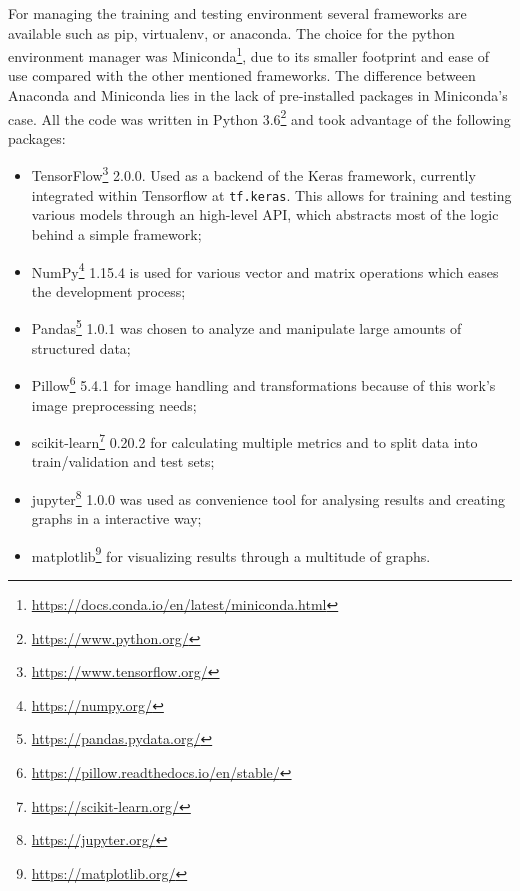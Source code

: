     For managing the training and testing environment several frameworks are available such as pip, virtualenv, or anaconda. The choice for the python environment manager was Miniconda\footnote{\url{https://docs.conda.io/en/latest/miniconda.html}}, due to its smaller footprint and ease of use compared with the other mentioned frameworks. The difference between Anaconda and Miniconda lies in the lack of pre-installed packages in Miniconda's case. 
    All the code was written in Python 3.6\footnote{\url{https://www.python.org/}} and took advantage of the following packages:
    
    \begin{itemize}
        \item TensorFlow\footnote{\url{https://www.tensorflow.org/}} 2.0.0. Used as a backend of the Keras framework, currently integrated within Tensorflow at \verb|tf.keras|. This allows for training and testing various models through an high-level API, which abstracts most of the logic behind a simple framework;
        \item NumPy\footnote{\url{https://numpy.org/}} 1.15.4 is used for various vector and matrix operations which eases the development process;
        \item Pandas\footnote{\url{https://pandas.pydata.org/}} 1.0.1 was chosen to analyze and manipulate large amounts of structured data;
        \item Pillow\footnote{\url{https://pillow.readthedocs.io/en/stable/}} 5.4.1 for image handling and transformations because of this work's image preprocessing needs;
        \item scikit-learn\footnote{\url{https://scikit-learn.org/}} 0.20.2 for calculating multiple metrics and to split data into train/validation and test sets;
        \item jupyter\footnote{\url{https://jupyter.org/}} 1.0.0 was used as convenience tool for analysing results and creating graphs in a interactive way;
        \item matplotlib\footnote{\url{https://matplotlib.org/}} for visualizing results through a multitude of graphs.
    \end{itemize}
    
